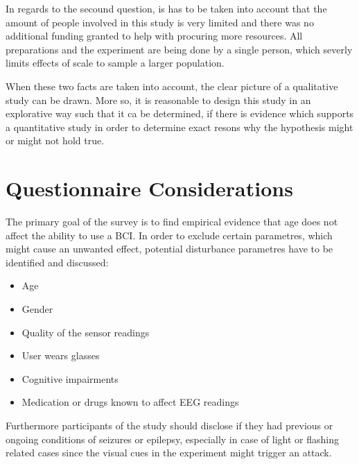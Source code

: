             In regards to the secound question, is has to be taken into account that the amount of people involved in this study is very limited and there was no additional funding granted to help with procuring more resources. All preparations and the experiment are being done by a single person, which severly limits effects of scale to sample a larger population.

            When these two facts are taken into account, the clear picture of a qualitative study can be drawn. More so, it is reasonable to design this study in an explorative way such that it ca be determined, if there is evidence which supports a quantitative study in order to determine exact resons why the hypothesis might or might not hold true.       

        \section{Questionnaire Considerations}\label{considerations}

            The primary goal of the survey is to find empirical evidence that age does not affect the ability to use a BCI. In order to exclude certain parametres, which might cause an unwanted effect, potential disturbance parametres have to be identified and discussed:

            \begin{itemize}
                \item Age
                \item Gender
                \item Quality of the sensor readings
                \item User wears glasses
                \item Cognitive impairments
                \item Medication or drugs known to affect EEG readings
            \end{itemize}

            Furthermore participants of the study should disclose if they had previous or ongoing conditions of seizures or epilepsy, especially in case of light or flashing related cases since the visual cues in the experiment might trigger an attack.

